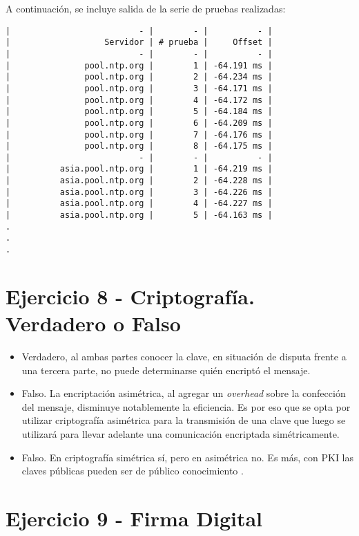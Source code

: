 A continuación, se incluye salida de la serie de pruebas realizadas:

\begin{lstlisting}
|                          - |        - |          - |
|                   Servidor | # prueba |     Offset |
|                          - |        - |          - |
|               pool.ntp.org |        1 | -64.191 ms |
|               pool.ntp.org |        2 | -64.234 ms |
|               pool.ntp.org |        3 | -64.171 ms |
|               pool.ntp.org |        4 | -64.172 ms |
|               pool.ntp.org |        5 | -64.184 ms |
|               pool.ntp.org |        6 | -64.209 ms |
|               pool.ntp.org |        7 | -64.176 ms |
|               pool.ntp.org |        8 | -64.175 ms |
|                          - |        - |          - |
|          asia.pool.ntp.org |        1 | -64.219 ms |
|          asia.pool.ntp.org |        2 | -64.228 ms |
|          asia.pool.ntp.org |        3 | -64.226 ms |
|          asia.pool.ntp.org |        4 | -64.227 ms |
|          asia.pool.ntp.org |        5 | -64.163 ms |
.
.
.
\end{lstlisting}

\section{Ejercicio 8 - Criptografía. Verdadero o Falso}

\begin{itemize}
    \item Verdadero, al ambas partes conocer la clave, en situación de disputa frente a una tercera parte, no puede determinarse quién encriptó el mensaje.
    \item Falso. La encriptación asimétrica, al agregar un \emph{overhead} sobre la confección del mensaje, disminuye notablemente la eficiencia. Es por eso que se opta por utilizar criptografía asimétrica para la transmisión de una clave que luego se utilizará para llevar adelante una comunicación encriptada simétricamente.
    \item Falso. En criptografía simétrica sí, pero en asimétrica no. Es más, con PKI las claves públicas pueden ser de público conocimiento \autocite{WikipediaDigitalSignature}.
\end{itemize}

\section{Ejercicio 9 - Firma Digital}

